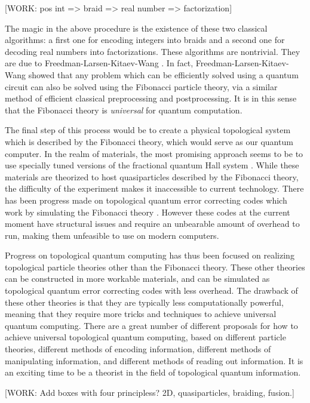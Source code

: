 \documentclass{article}
\theoremstyle{definition}
\numberwithin{figure}{section}
\begin{document}
[WORK: pos int => braid => real number => factorization]

The magic in the above procedure is the existence of these two classical algorithms: a first one for encoding integers into braids and a second one for decoding real numbers into factorizations. These algorithms are nontrivial. They are due to Freedman-Larsen-Kitaev-Wang \cite{freedman2002modular}. In fact, Freedman-Larsen-Kitaev-Wang showed that any problem which can be efficiently solved using a quantum circuit can also be solved using the Fibonacci particle theory, via a similar method of efficient classical preprocessing and postprocessing. It is in this sense that the Fibonacci theory is \textit{universal} for quantum computation.

The final step of this process would be to create a physical topological system which is described by the Fibonacci theory, which would serve as our quantum computer. In the realm of materials, the most promising approach seems to be to use specially tuned versions of the fractional quantum Hall system \cite{zhu2015fractional}. While these materials are theorized to host quasiparticles described by the Fibonacci theory, the difficulty of the experiment makes it inaccessible to current technology. There has been progress made on topological quantum error correcting codes which work by simulating the Fibonacci theory \cite{schotte2022quantum, schotte2022fault}. However these codes at the current moment have structural issues and require an unbearable amount of overhead to run, making them unfeasible to use on modern computers.

Progress on topological quantum computing has thus been focused on realizing topological particle theories other than the Fibonacci theory. These other theories can be constructed in more workable materials, and can be simulated as topological quantum error correcting codes with less overhead. The drawback of these other theories is that they are typically less computationally powerful, meaning that they require more tricks and techniques to achieve universal quantum computing. There are a great number of different proposals for how to achieve universal topological quantum computing, based on different particle theories, different methods of encoding information, different methods of manipulating information, and different methods of reading out information. It is an exciting time to be a theorist in the field of topological quantum information.

[WORK: Add boxes with four principless? 2D, quasiparticles, braiding, fusion.]
\end{document}
